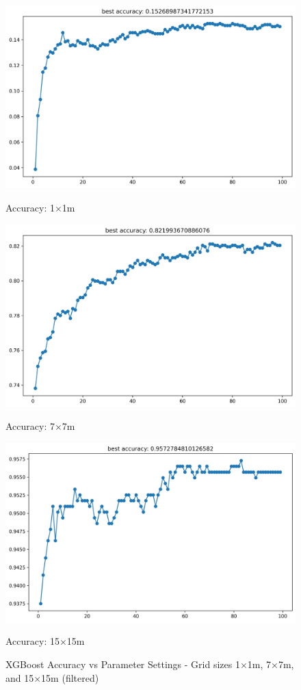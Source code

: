 \documentclass[runningheads]{llncs}
\begin{document}
\begin{figure}[H]
	\centering
	\begin{minipage}{0.32\textwidth}
		\centering
		\includegraphics[width=\textwidth]{figures/xgb_softmax_acc_1.png}
		\caption*{Accuracy: 1×1m}
	\end{minipage}
	\hfill
	\begin{minipage}{0.32\textwidth}
		\centering
		\includegraphics[width=\textwidth]{figures/xgb_softmax_acc_7.png}
		\caption*{Accuracy: 7×7m}
	\end{minipage}
	\hfill
	\begin{minipage}{0.32\textwidth}
		\centering
		\includegraphics[width=\textwidth]{figures/xgb_softmax_acc_15.png}
		\caption*{Accuracy: 15×15m}
	\end{minipage}
	\caption{XGBoost Accuracy vs Parameter Settings - Grid sizes 1×1m, 7×7m, and 15×15m (filtered)}
\end{figure}
\end{document}
